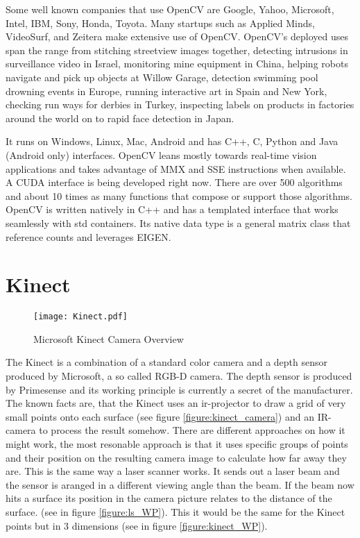 Some well known companies that use OpenCV are Google, Yahoo, Microsoft, Intel, IBM, Sony, Honda, Toyota. Many startups such as Applied Minds, VideoSurf, and Zeitera make extensive use of OpenCV. OpenCV’s deployed uses span the range from stitching streetview images together, detecting intrusions in surveillance video in Israel, monitoring mine equipment in China, helping robots navigate and pick up objects at Willow Garage, detection swimming pool drowning events in Europe, running interactive art in Spain and New York, checking run ways for derbies in Turkey, inspecting labels on products in factories around the world on to rapid face detection in Japan.

It runs on Windows, Linux, Mac, Android and has C++, C, Python and Java (Android only) interfaces. OpenCV leans mostly towards real-time vision applications and takes advantage of MMX and SSE instructions when available. A CUDA interface is being developed right now. There are over 500 algorithms and about 10 times as many functions that compose or support those algorithms. OpenCV is written natively in C++ and has a templated interface that works seamlessly with std containers. Its native data type is a general matrix class that reference counts and leverages EIGEN.
\clearpage

\section{Kinect}
\begin{figure}[htp]
	\centering
	\texttt{[image: Kinect.pdf]}
	\caption{Microsoft Kinect Camera Overview}
	\label{figure:kinect_camera}
\end{figure}

The Kinect is a combination of a standard color camera and a depth sensor produced by Microsoft, a so called RGB-D camera. 
The depth sensor is produced by Primesense and its working principle is currently a secret of the manufacturer. 
The known facts are, that the Kinect uses an ir-projector to draw a grid of very small points onto each surface 
(see figure \vref{figure:kinect_camera}) and an IR-camera to process the result somehow.  
There are different approaches on how it might work, the most resonable approach is that it uses 
specific groups of points and their position on the resulting camera image to calculate how far 
away they are. This is the same way a laser scanner works. 
It sends out a laser beam and the sensor is aranged in a different viewing angle than the beam.
If the beam now hits a surface its position in the camera picture relates to the distance of the surface.
(see in figure \vref{figure:ls_WP}). This it would be the same for the Kinect points but in 3 dimensions 
(see in figure \vref{figure:kinect_WP}).

